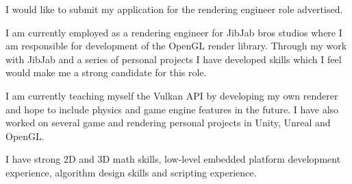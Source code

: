I would like to submit my application for the rendering engineer role advertised.

I am currently employed as a rendering engineer for JibJab bros studios where I am responsible for development of the OpenGL render library.
Through my work with JibJab and a series of personal projects I have developed skills which I feel would make me a strong candidate for this role.

I am currently teaching myself the Vulkan API by developing my own renderer and hope to include physics and game engine features in the future.
I have also worked on several game and rendering personal projects in Unity, Unreal and OpenGL.

I have strong 2D and 3D math skills, low-level embedded platform development experience, algorithm design skills and scripting experience.